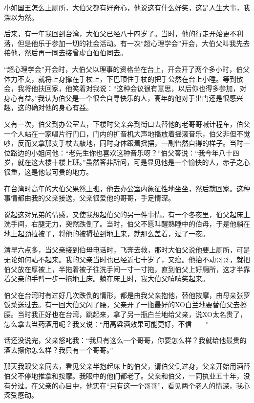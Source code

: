 \par 小如国王怎么上厕所，大伯父都有好奇心，他说这有什么好笑，这是人生大事，我深以为然。
\par 后来，有一年我回到台湾，大伯父已经八十四岁了。当时，他的行走开始更不利落，但是他乐于参加一切的社会活动。有一次“超心理学会”开会，大伯父叫我先去接他，然后再一同去接曾虚白伯伯同去。
\par “超心理学会”开会时，大伯父以理事的资格坐在台上，开会开了两个多小时，伯父体力不支，就将上身撑在手杖上，下巴顶住手杖的把手公然在台上小睡。等到散会，我将他扶回家，他笑着对我说：“这种会议很有意思，以后你也得多参加，对身心有益。”我认为伯父是一个很会自寻快乐的人，高年的他对于出门还是很感兴趣，这的确对他的身心有益。
\par 又有一次，伯父到办公室去，下楼时父亲奔到街口去替他的老哥哥喊计程车，伯父一个人站在一家唱片行门口，门内的扩音机大声地播放着摇滚音乐，伯父非但不觉吵，反而又拿那支手杖去敲地，同时身体跟着摇摆，一副怡然自得的样子。当时一位路边的小姐问他：“老先生你也喜欢这种音乐呀？”伯父答说：“我今年八十四岁，就在这大楼十楼上班。”虽然答非所问，可是显见他是一个愉快的人，赤子之心很重，这是他最可贵的地方。
\par 在台湾时高年的大伯父果然上班，他去办公室内象征性地坐坐，然后就回家。这种事情都由我的父亲接送，父亲很爱他的哥哥，手足情深。
\par 说起这对兄弟的情感，又使我想起伯父的另一件事情。有一个冬夜里，伯父起床上洗手间，右腿无力，突然跌倒了。当时，伯父不愿叫醒熟睡中的伯母，于是他躺在地上起劲拉被子，将他的被褥拉到地上来，就那么盖着，过了一夜。
\par 清早六点多，当父亲接到伯母电话时，飞奔去救，那时大伯父说他要上厕所，可是无论如何站不起来。我的父亲当时也已经近七十岁了，又瘦。他抬不动哥哥，就把伯父放在厚被上，半拖着被子往洗手间一寸一寸拖，直到伯父上好厕所，这才半靠着父亲的手臂一步一拖地上床。躺在床上时，我大伯父嘻嘻笑起来。
\par 伯父在台湾时有过好几次跌倒的情形，都是由我父亲抱他，替他按摩，由母亲张罗饭菜送过去。有一回大伯父闪了腰，父亲开了一瓶最好的XO白兰地要替伯父去擦腰。当时我正好也在台湾，跳起来，拿了另一瓶白兰地给父亲，说XO太名贵了，怎么拿去当药酒用呢？我又说：“用高粱酒效果可能更好，不信——”
\par 话还没说完，父亲怒叱我：“我只有这么一个哥哥，你要怎么样？我就给他最贵的酒去擦你怎么样？我只有一个哥哥。”
\par 那天我跟父亲同去，看见父亲半抱起床上的伯父，请伯父侧过身，父亲开始用酒替伯父不停地推拿和按摩。我眼中的他们都老了。父亲和伯父，一同执业五十年，没有分过。在父亲的心目中，他实在“只有这一个哥哥”，看见两个老人的情深，我心深受感动。

